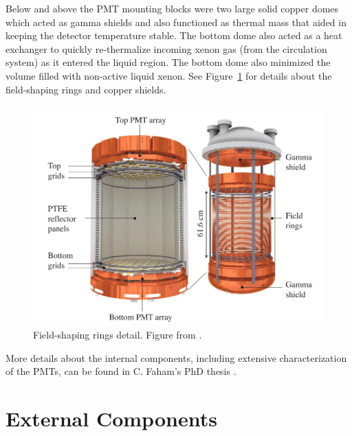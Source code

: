 Below and above the \ac{PMT} mounting blocks were two large solid copper domes which acted as gamma shields and also functioned as thermal mass that aided in keeping the detector temperature stable. The bottom dome also acted as a heat exchanger to quickly re-thermalize incoming xenon gas (from the circulation system) as it entered the liquid region. The bottom dome also minimized the volume filled with non-active liquid xenon. See Figure~\ref{fig:lux2} for details about the field-shaping rings and copper shields.

\begin{figure}[htbp]
\begin{center}
\includegraphics[width=\textwidth]{figures/lux/lux_inner2.png}
\caption{Field-shaping rings detail. Figure from \cite{LUXDetectorPaper}. }
\label{fig:lux2}
\end{center}
\end{figure}


More details about the internal components, including extensive characterization of the \ac{PMT}s, can be found in C. Faham's PhD thesis \cite{Faham2014a}.

\section{External Components}

